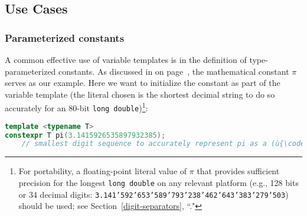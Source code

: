 \subsection[Use Cases]{Use Cases}\label{variabletemplate-use-cases}

\subsubsection[Parameterized constants]{Parameterized constants}\label{parametrized-constants}

A common effective use of variable templates is in the definition of
type-parameterized constants. As discussed in {\it{}} on page~\pageref{variabletemplate-description}, the mathematical
constant $\pi$ serves as our example. Here we want to
initialize the constant as part of the variable template (the literal
chosen is the shortest decimal string to do so accurately for an 80-bit
\texttt{long}~\texttt{double}){\cprotect\footnote{For
portability, a floating-point literal value of \(\pi\) that provides
sufficient precision for the longest \texttt{long}~\texttt{double} on
any relevant platform (e.g., 128 bits or 34 decimal digits:
\texttt{3.141'592'653'589'793'238'462'643'383'279'503}) should be
  used; see Section~\ref{digit-separators}, ``."}}:

\begin{lstlisting}[language=C++]
template <typename T>
constexpr T pi(3.1415926535897932385);
    // smallest digit sequence to accurately represent pi as a (ù{\codeincomments{long double}}ù)
\end{lstlisting}


